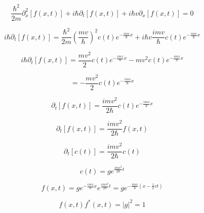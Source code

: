 \documentclass[12pt]{article}
\begin{document}
\begin{enumerate}
          \[
              \frac{\hbar^2}{2m} \partial^2_x [f(x,t)]
              + i\hbar \partial_t [f(x,t)]
              + i \hbar v \partial_x [f(x,t)]
              = 0
          \]

          \[
              i\hbar \partial_t [f(x,t)]
              =
              \frac{\hbar^2}{2m}{(\frac{m v}{\hbar})}^2 c(t)e^{-\frac{i m v}{\hbar}x}
              + i \hbar v \frac{i m v}{\hbar} c(t) e^{-\frac{i m v}{\hbar}x}
          \]

          \[
              i\hbar \partial_t [f(x,t)]
              =
              \frac{mv^2}{2} c(t)e^{-\frac{i m v}{\hbar}x}
              - m v^2 c(t) e^{-\frac{i m v}{\hbar}x}
          \]

          \[
              =
              - \frac{mv^2}{2} c(t) e^{-\frac{i m v}{\hbar}x}
          \]

          \[
              \partial_t [f(x,t)] = \frac{i mv^2}{2 \hbar} c(t)e^{-\frac{i m v}{\hbar}x}
          \]

          \[
              \partial_t [f(x,t)] = \frac{i mv^2}{2 \hbar} f(x,t)
          \]



          \[
              \partial_t [c(t)] = \frac{i mv^2}{2 \hbar} c(t)
          \]

          \[
              c(t) = g e^{\frac{i mv^2}{2 \hbar} t}
          \]

          \[
              f(x,t) = g e^{-\frac{i m v}{\hbar}x}e^{\frac{i mv^2}{2 \hbar} t}
              = ge^{-\frac{i m v}{\hbar}(x - \frac{1}{2}vt)}
          \]

          \[
              f(x,t) f^*(x,t) = {\left\lvert g \right\rvert}^2 = 1
          \]


\end{enumerate}
\end{document}
